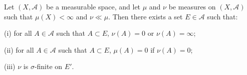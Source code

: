 Let $(X, \mathcal{A})$ be a measurable space, and let $\mu$ and $\nu$ be measures on $(X, \mathcal{A})$ such that $\mu(X) < \infty$ and $\nu \ll \mu$. Then there exists a set $E \in \mathcal{A}$ such that:

(i) for all $A \in \mathcal{A}$ such that $A \subset E$, $\nu(A) = 0$ or $\nu(A) = \infty$;

(ii) for all $A \in \mathcal{A}$ such that $A \subset E$, $\mu(A) = 0$ if $\nu(A) = 0$;

(iii) $\nu$ is $\sigma$-finite on $E'$.